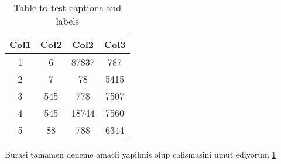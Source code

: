 \documentclass[12pt]{article}
\begin{document}
\begin{table}[h!]
\centering
\begin{tabular}{|c c c c|} 
 \hline
 Col1 & Col2 & Col2 & Col3 \\ [0.5ex] 
 \hline\hline
 1 & 6 & 87837 & 787 \\ 
 2 & 7 & 78 & 5415 \\
 3 & 545 & 778 & 7507 \\
 4 & 545 & 18744 & 7560 \\
 5 & 88 & 788 & 6344 \\ [1ex] 
 \hline
\end{tabular}
\caption{Table to test captions and labels}
\label{table:data}
\end{table}
\newpage

Burasi tamamen deneme amacli yapilmis olup calismasini umut ediyorum \ref{table:data}


\cite[]{dirac}
\end{document}
